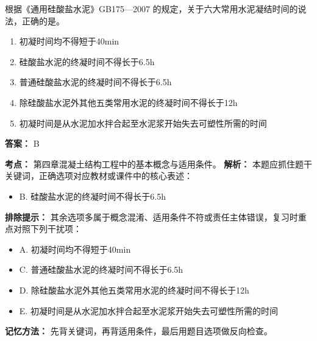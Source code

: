 \documentclass[UTF8,fontset=fandol,11pt]{ctexart}
\begin{document}
\begin{quizbox}[title={第 32 题}]
根据《通用硅酸盐水泥》GB175—2007 的规定，关于六大常用水泥凝结时间的说法，正确的是。\\
\begin{enumerate}[label=\Alph*.]
\item 初凝时间均不得短于40min
\item 硅酸盐水泥的终凝时间不得长于6.5h
\item 普通硅酸盐水泥的终凝时间不得长于6.5h
\item 除硅酸盐水泥外其他五类常用水泥的终凝时间不得长于12h
\item 初凝时间是从水泥加水拌合起至水泥浆开始失去可塑性所需的时间
\end{enumerate}
\textbf{答案：} B
\vspace{0.25em}
\begin{answerbox}[title={考点解析}]
\textbf{考点：} 第四章混凝土结构工程中的基本概念与适用条件。
\textbf{解析：} 本题应抓住题干关键词，正确选项对应教材或课件中的核心表述：
\begin{itemize}
\item B. 硅酸盐水泥的终凝时间不得长于6.5h
\end{itemize}
\textbf{排除提示：} 其余选项多属于概念混淆、适用条件不符或责任主体错误，复习时重点对照下列干扰项：
\begin{itemize}
\item A. 初凝时间均不得短于40min
\item C. 普通硅酸盐水泥的终凝时间不得长于6.5h
\item D. 除硅酸盐水泥外其他五类常用水泥的终凝时间不得长于12h
\item E. 初凝时间是从水泥加水拌合起至水泥浆开始失去可塑性所需的时间
\end{itemize}
\textbf{记忆方法：} 先背关键词，再背适用条件，最后用题目选项做反向检查。
\end{answerbox}
\end{quizbox}
\end{document}
